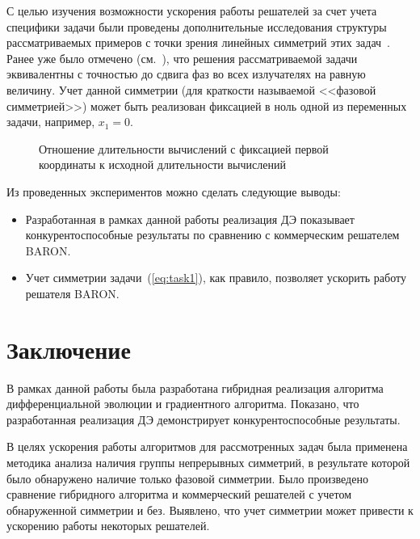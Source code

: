 \documentclass{llncs}
\begin{document}
С целью изучения возможности ускорения работы решателей за счет учета специфики задачи были проведены дополнительные исследования 
структуры рассматриваемых примеров с точки зрения линейных симметрий этих задач~\cite{yurkov:symmetry}. Ранее уже было отмечено (см.~\cite{tyunin:dao}), что решения рассматриваемой задачи эквивалентны с точностью до сдвига фаз во всех излучателях на равную величину.
Учет данной симметрии (для краткости называемой <<фазовой симметрией>>) может быть реализован фиксацией в ноль одной из переменных задачи, например, $x_1=0$. 

\begin{figure}
\caption{Отношение длительности вычислений с фиксацией первой координаты к исходной длительности вычислений}
\label{ris:ring}
\end{figure}

Из проведенных экспериментов можно сделать следующие выводы:
\begin{itemize}
  \item Разработанная в рамках данной работы реализация ДЭ показывает конкурентоспособные результаты по сравнению с коммерческим решателем BARON.
  \item Учет симметрии задачи~(\ref{eq:task1}), как правило, позволяет ускорить работу решателя BARON.
\end{itemize}

\section{Заключение}\label{sec:conclusion}

В рамках данной работы была разработана гибридная реализация алгоритма дифференциальной эволюции и градиентного алгоритма. Показано, что разработанная реализация ДЭ демонстрирует конкурентоспособные результаты.

В целях ускорения работы алгоритмов для рассмотренных задач была применена методика анализа наличия группы непрерывных симметрий, в результате которой было обнаружено наличие только фазовой симметрии. Было произведено сравнение гибридного алгоритма и коммерческий решателей с учетом обнаруженной симметрии и без. Выявлено, что учет симметрии может привести к ускорению работы некоторых решателей.
\end{document}
